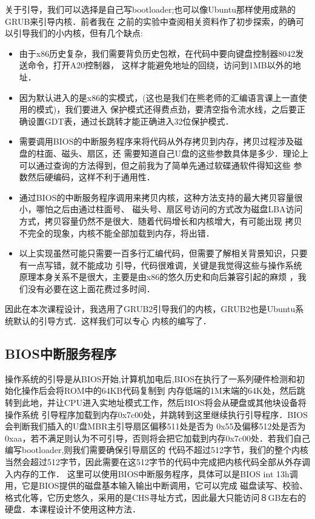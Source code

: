 关于引导，我们可以选择是自己写bootloader;也可以像Ubuntu那样使用成熟的GRUB来引导内核．前者我在
之前的实验中查阅相关资料作了初步探索，的确可以引导我们的小内核，但有几个缺点:
\begin{itemize}
    \item 由于x86历史复杂，我们需要背负历史包袱，在代码中要向键盘控制器8042发送命令，打开A20控制器，
这样才能避免地址的回绕，访问到1MB以外的地址．
    \item 因为默认进入的是x86的实模式，(这也是我们在熊老师的汇编语言课上一直使用的模式)，我们要进入
保护模式还得费点劲，要清空指令流水线，之后要正确设置GDT表，通过长跳转才能正确进入32位保护模式．
    \item 需要调用BIOS的中断服务程序来将代码从外存拷贝到内存，拷贝过程涉及磁盘的柱面、磁头、扇区，还
需要知道自己U盘的这些参数具体是多少．理论上可以通过查询的方法得到，但之前我为了简单先通过软碟通软件得知这些
参数然后硬编码，这样不利于通用性．
    \item 通过BIOS的中断服务程序调用来拷贝内核，这种方法支持的最大拷贝容量很小，哪怕之后由通过柱面号、
磁头号、扇区号访问的方式改为磁盘LBA访问方式，拷贝容量仍然不是很大．随着代码增长和内核增大，有可能出现
拷贝不完全的现象，内核不能全部加载到内存，将出错．
    \item 以上实现虽然可能只需要一百多行汇编代码，但需要了解相关背景知识，只要有一点写错，就不能成功
引导，代码很难调，关键是我觉得这些与操作系统原理本身关系不是很大，主要是由x86的悠久历史和向后兼容引起的麻烦
，我们没有必要在这上面花费过多时间．    
\end{itemize}
因此在本次课程设计，我选用了GRUB2引导我们的内核，GRUB2也是Ubuntu系统默认的引导方式．这样我们可以专心
内核的编写了．
\subsection{BIOS中断服务程序}
操作系统的引导是从BIOS开始,计算机加电后,BIOS在执行了一系列硬件检测和初始化操作后会将ROM中的64KB代码复制到
内存低端的1M末端的64K处，然后跳转到此地，并让CPU进入实地址模式工作，然后BIOS将会从硬盘或其他块设备将操作系统
引导程序加载到内存0x7c00处，并跳转到这里继续执行引导程序．BIOS会判断我们插入的U盘MBR主引导扇区偏移511处是否为
0x55及偏移512处是否为0xaa，若不满足则认为不可引导，否则将会把它加载到内存0x7c00处．若我们自己编写bootloader,则我们需要确保引导扇区的
代码不超过512字节，我们的整个内核当然会超过512字节，因此需要在这512字节的代码中完成把内核代码全部从外存调入内存的工作．
这里可以使用BIOS中断服务程序，具体可以是BIOS int 13h调用，它是BIOS提供的磁盘基本输入输出中断调用，它可以完成
磁盘读写、校验、格式化等，它历史悠久，采用的是CHS寻址方式，因此最大只能访问８GB左右的硬盘．本课程设计不使用这种方法．
